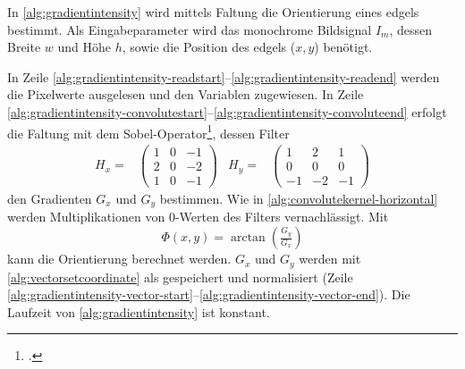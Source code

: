 In \autoref{alg:gradientintensity} wird mittels Faltung die Orientierung eines \glspl{edgel} bestimmt. Als
 Eingabeparameter wird das monochrome Bildsignal $I_m$, dessen Breite $w$ und Höhe $h$, sowie die Position des
 \glspl{edgel} ($x,y$) benötigt.

In Zeile \ref{alg:gradientintensity-readstart}--\ref{alg:gradientintensity-readend} werden die Pixelwerte ausgelesen
 und den Variablen zugewiesen. In Zeile
 \ref{alg:gradientintensity-convolutestart}--\ref{alg:gradientintensity-convoluteend} erfolgt die Faltung mit dem
 Sobel-Operator\footcite[Vgl.][S.~120--123]{burger05}, dessen Filter
\begin{subequations}
\begin{align}
	H_x =&
	\begin{pmatrix}
		1& 0& -1\\
		2& 0& -2\\
		1& 0& -1
	\end{pmatrix}
\end{align}
\begin{align}
	H_y =&
	\begin{pmatrix}
		1& 2& 1\\
		0& 0& 0\\
		-1& -2& -1
	\end{pmatrix}
\end{align}
\end{subequations}
den Gradienten $G_x$ und $G_y$ bestimmen. Wie in \autoref{alg:convolutekernel-horizontal} werden Multiplikationen von
 $0$-Werten des Filters vernachlässigt. Mit
\begin{equation}
	\label{eq:orientation}
	\Phi(x,y) = \arctan{\left(\tfrac{G_y}{G_x}\right)}
\end{equation}
kann die Orientierung berechnet werden. $G_x$ und $G_y$ werden mit \autoref{alg:vectorsetcoordinate} als
  gespeichert und normalisiert
 (Zeile \ref{alg:gradientintensity-vector-start}--\ref{alg:gradientintensity-vector-end}). Die Laufzeit von
 \autoref{alg:gradientintensity} ist konstant.


